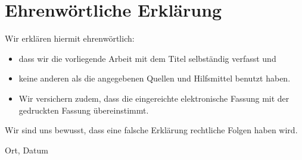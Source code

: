\clearpage
\chapter*{Ehrenwörtliche Erklärung}	



Wir erklären hiermit ehrenwörtlich: 

\begin{itemize}
	\item dass wir die vorliegende Arbeit mit dem Titel \textit{\DerTitelDerArbeit} selbständig verfasst und
	\item keine anderen als die angegebenen Quellen und Hilfsmittel benutzt haben. 
	\item Wir versichern zudem, dass die eingereichte elektronische Fassung mit der gedruckten Fassung übereinstimmt.
\end{itemize}
Wir sind uns bewusst, dass eine falsche Erklärung rechtliche Folgen haben wird.

\vspace{3cm}
Ort, Datum \hfill \DerAutorDerArbeit 